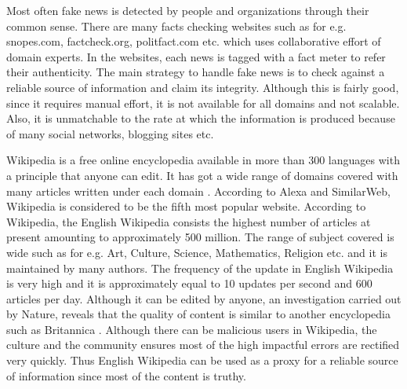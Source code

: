 \documentclass[a4paper, 11pt]{article}
\begin{document}
Most often fake news is detected by people and organizations through their common sense. There are many facts checking websites such as for e.g. snopes.com, factcheck.org, politfact.com etc. which uses collaborative effort of domain experts. In the websites, each news is tagged with a fact meter to refer their authenticity. The main strategy to handle fake news is to check against a reliable source of information and claim its integrity. Although this is fairly good, since it requires manual effort, it is not available for all domains and not scalable. Also, it is unmatchable to the rate at which the information is produced because of many social networks, blogging sites etc.

Wikipedia is a free online encyclopedia available in more than 300 languages with a principle that anyone can edit. It has got a wide range of domains covered with many articles written under each domain \cite{Wales2005}. According to Alexa and SimilarWeb, Wikipedia is considered to be the fifth most popular website. According to Wikipedia, the English Wikipedia consists the highest number of articles at present amounting to approximately 500 million. The range of subject covered is wide such as for e.g. Art, Culture, Science, Mathematics, Religion etc. and it is maintained by many authors. The frequency of the update in English Wikipedia is very high and it is approximately equal to 10 updates per second and 600 articles per day. Although it can be edited by anyone, an investigation carried out by Nature, reveals that the quality of content is similar to another encyclopedia such as Britannica \cite{Wales2005}. Although there can be malicious users in Wikipedia, the culture and the community ensures most of the high impactful errors are rectified very quickly\cite{Priedhorsky2007}. Thus English Wikipedia can be used as a proxy for a reliable source of information since most of the content is truthy.
 
\end{document}
